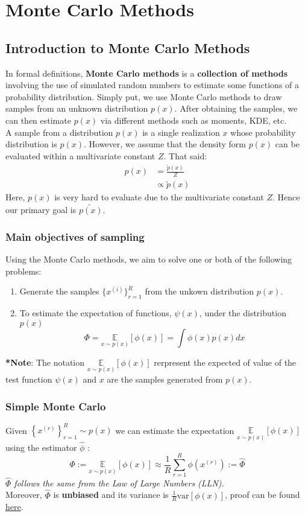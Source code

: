 \section{Monte Carlo Methods}
\subsection{Introduction to Monte Carlo Methods}
In formal definitions, \textbf{Monte Carlo methods} is a \textbf{collection of methods} involving the use of simulated random numbers to estimate some functions of a probability distribution. Simply put, we use Monte Carlo methods to draw samples from an unknown distribution $p(x)$. After obtaining the samples, we can then estimate $p(x)$ via different methods such as moments, KDE, etc.\\

A sample from a distribution $p(x)$ is a single realization $x$ whose probability distribution is $p(x)$. However, we assume that the density form $p(x)$ can be evaluated within a multivariate constant $Z$. That said:
\begin{align*}
    p(x) &= \frac{\tilde{p}(x)}{Z} \\
         &\propto \tilde{p}(x)
\end{align*}
Here, $p(x)$ is very hard to evaluate due to the multivariate constant $Z$. Hence our primary goal is $\tilde{p(x)}$.
\subsubsection*{Main objectives of sampling}
Using the Monte Carlo methods, we aim to solve one or both of the following problems:
\begin{enumerate}
    \item Generate the samples $\{x^{(i)}\}^R_{r=1}$ from the unkown distribution $p(x)$.
    \item To estimate the expectation of functions, $\psi(x)$, under the distribution $p(x)$
    $$\Phi=\underset{x \sim p(x)}{\mathbb{E}}[\phi(x)]=\int \phi(x) p(x) d x$$
\end{enumerate}
\textbf{*Note}: The notation $\underset{x \sim p(x)}{\mathbb{E}}[\phi(x)]$ rerpresent the expected of value of the test function $\psi(x)$ and $x$ are the samples generated from $p(x)$.
\subsubsection*{Simple Monte Carlo}
Given $\left\{x^{(r)}\right\}_{r=1}^R \sim p(x)$ we can estimate the expectation $\underset{x \sim p(x)}{\mathbb{E}}[\phi(x)]$ using the estimator $\hat{\phi}$ :
$$
\Phi:=\underset{x \sim p(x)}{\mathbb{E}}[\phi(x)] \approx \frac{1}{R} \sum_{r=1}^R \phi\left(x^{(r)}\right):=\hat{\Phi}
$$
\textit{$\hat{\Phi}$ follows the same from the Law of Large Numbers (LLN).}\\
Moreover, $\hat{\Phi}$ is \textbf{unbiased} and its variance is $\frac1R\text{var}[\phi(x)]$, proof can be found \hyperref[smc]{here}.

